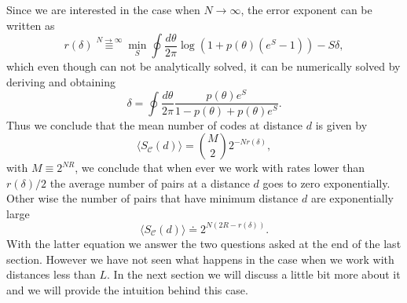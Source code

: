 Since we are interested in the case when $N\to \infty$, the error exponent can be written as
\begin{equation}
r(\delta)\stackrel{N\to \infty}{\equiv}\min_{S}\oint \frac{d\theta}{2\pi}\log\left(1+p(\theta)(e^S -1)\right) -S\delta,
\label{CH2:Error_exponent}
\end{equation}
which even though can not be analytically solved, it can be numerically solved by deriving and obtaining
\begin{equation}
\delta = \oint \frac{d\theta}{2\pi} \frac{p(\theta)e^{S}}{1-p(\theta) + p(\theta)e^S}.
\end{equation}
Thus we conclude that the mean number of codes at distance $d$ is given by
\begin{equation}
\langle S_{\mathcal{C}}(d)\rangle = {M \choose 2} 2^{-Nr(\delta)},
\end{equation}
with $M\equiv 2^{NR}$, we conclude that when ever we work with rates lower than $r(\delta)/2$ the average number of pairs at a distance $d$ goes to zero exponentially. Other wise the number of pairs that have minimum distance $d$ are exponentially large
\begin{equation}
\langle S_{\mathcal{C}}(d)\rangle \doteq  2^{N(2R-r(\delta))}.
\end{equation}
With the latter equation we answer the two questions asked at the end of the last section. However we have not seen what happens in the case when we work with distances less than $L$. In the next section we will discuss a little bit more about it and we will provide the intuition behind this case.
